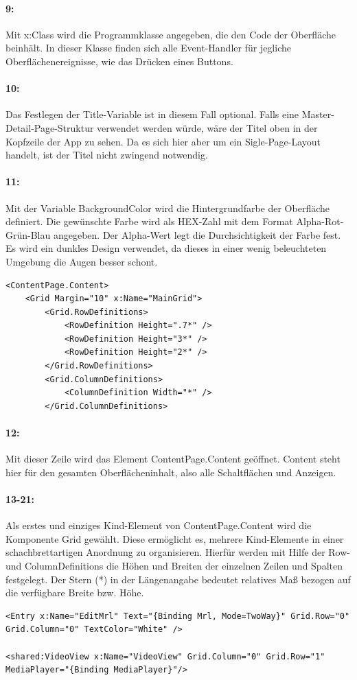 \paragraph{9:} Mit x:Class wird die Programmklasse angegeben, die den Code der Oberfläche beinhält. In dieser Klasse finden sich alle Event-Handler für jegliche Oberflächenereignisse, wie das Drücken eines Buttons.
\paragraph{10:} Das Festlegen der Title-Variable ist in diesem Fall optional. Falls eine Master-Detail-Page-Struktur verwendet werden würde, wäre der Titel oben in der Kopfzeile der App zu sehen. Da es sich hier aber um ein Sigle-Page-Layout handelt, ist der Titel nicht zwingend notwendig.
\paragraph{11:} Mit der Variable BackgroundColor wird die Hintergrundfarbe der Oberfläche definiert. Die gewünschte Farbe wird als HEX-Zahl mit dem Format Alpha-Rot-Grün-Blau angegeben. Der Alpha-Wert legt die Durchsichtigkeit der Farbe fest. Es wird ein dunkles Design verwendet, da dieses in einer wenig beleuchteten Umgebung die Augen besser schont.

\begin{verbatim}
<ContentPage.Content>
    <Grid Margin="10" x:Name="MainGrid">
        <Grid.RowDefinitions>
            <RowDefinition Height=".7*" />
            <RowDefinition Height="3*" />
            <RowDefinition Height="2*" />
        </Grid.RowDefinitions>
        <Grid.ColumnDefinitions>
            <ColumnDefinition Width="*" />
        </Grid.ColumnDefinitions>
\end{verbatim}
\paragraph{12:} Mit dieser Zeile wird das Element ContentPage.Content geöffnet. Content steht hier für den gesamten Oberflächeninhalt, also alle Schaltflächen und Anzeigen.
\paragraph{13-21:} Als erstes und einziges Kind-Element von ContentPage.Content wird die Komponente Grid gewählt. Diese ermöglicht es, mehrere Kind-Elemente in einer schachbrettartigen Anordnung zu organisieren. Hierfür werden mit Hilfe der Row- und ColumnDefinitions die Höhen und Breiten der einzelnen Zeilen und Spalten festgelegt. Der Stern (*) in der Längenangabe bedeutet relatives Maß bezogen auf die verfügbare Breite bzw. Höhe.
\begin{verbatim}
<Entry x:Name="EditMrl" Text="{Binding Mrl, Mode=TwoWay}" Grid.Row="0" Grid.Column="0" TextColor="White" />

<shared:VideoView x:Name="VideoView" Grid.Column="0" Grid.Row="1" MediaPlayer="{Binding MediaPlayer}"/>
\end{verbatim}
